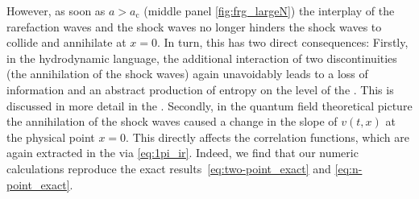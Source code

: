 However, as soon as $a > a_\mathrm{c}$ (middle panel \cref{fig:frg_largeN}) the interplay of the rarefaction waves and the shock waves no longer hinders the shock waves to collide and annihilate at $x = 0$. In turn, this has two direct consequences: Firstly, in the hydrodynamic language, the additional interaction of two discontinuities (the annihilation of the shock waves) again unavoidably leads to a loss of information and an abstract production of entropy on the level of the \pde{}.
This is discussed in more detail in the .
Secondly, in the quantum field theoretical picture the annihilation of the shock waves caused a change in the slope of $v ( t, x )$ at the physical point $x = 0$.
This directly affects the \ipi{} correlation functions, which are again extracted in the \ir{} via \cref{eq:1pi_ir}. Indeed, we find that our numeric calculations reproduce the exact results~\eqref{eq:two-point_exact} and \eqref{eq:n-point_exact}.

